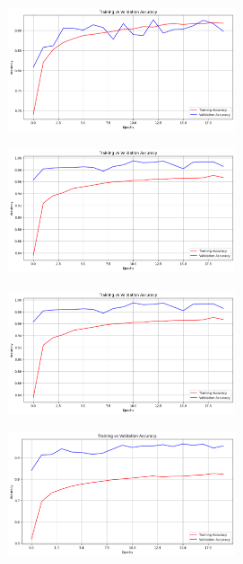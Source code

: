 \begin{multicols}{2}
\vspace{0.5cm}

\includegraphics[width=0.45\textwidth]{Assets/validation_accuracy/DENSENET201.png}

\vspace{0.5cm}

\includegraphics[width=0.45\textwidth]{Assets/validation_accuracy/EfficientNetB0.png}

\vspace{0.5cm}




\newpage

\includegraphics[width=0.45\textwidth]{Assets/validation_accuracy/EfficientNetB0.png}

\vspace{0.8cm}

\includegraphics[width=0.45\textwidth]{Assets/validation_accuracy/EfficientNetV2L.png}

\vspace{0.8cm}


\end{multicols}
